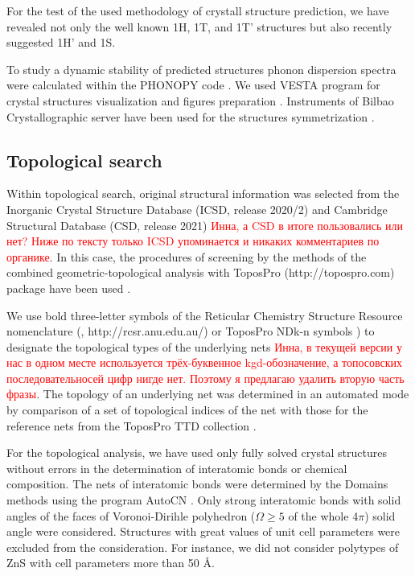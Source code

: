 \documentclass[a4paperm]{article}
\begin{document}
For the test of the used methodology of crystall structure prediction, we have revealed not only the well known 1H, 1T, and 1T' structures but also recently suggested 1H' and 1S.

To study a dynamic stability of predicted structures phonon dispersion spectra were calculated within the PHONOPY code \cite{phonopy}. 
We used VESTA program for crystal structures visualization and figures preparation \cite{momma2011vesta}.
Instruments of Bilbao Crystallographic server have been used for the structures symmetrization \cite{bilbao}.



\subsection*{Topological search}

Within topological search, original structural information was selected from the Inorganic Crystal Structure Database (ICSD, release 2020/2) \cite{icsd_1} and Cambridge Structural Database (CSD, release 2021) \cite{icsd_2} 
\textcolor{red}{Инна, а CSD в итоге пользовались или нет? Ниже по тексту только ICSD упоминается и никаких комментариев по органике}.
In this case, the procedures of screening  by the methods of the combined geometric-topological analysis with ToposPro (http://topospro.com) package have been used \cite{topos_1}. 

We use bold three-letter symbols of the Reticular Chemistry Structure Resource nomenclature (\cite{rcsr}, http://rcsr.anu.edu.au/) or ToposPro NDk-n symbols \cite{rcsr_2}) to designate the topological types of the underlying nets
\textcolor{red}{Инна, в текущей версии у нас в одном месте используется трёх-буквенное kgd-обозначение, а топосовских последовательносей цифр нигде нет. Поэтому я предлагаю удалить вторую часть фразы}.
The topology of an underlying net was determined in an automated mode by comparison of a set of topological indices of the net with those for the reference nets from the ToposPro TTD collection \cite{TTD}.

For the topological analysis, we have used only fully solved crystal structures without errors in the determination of interatomic bonds or chemical composition.
The nets of interatomic bonds were determined by the Domains methods using the program AutoCN \cite{blatov2016_rods}. 
Only strong interatomic bonds with solid angles of the faces of Voronoi-Dirihle polyhedron ($\Omega \geq 5 $ of the whole 4$\pi$) solid angle were considered.
Structures with great values of unit cell parameters were excluded from the consideration.
For instance, we did not consider polytypes of ZnS with cell parameters more than 50 \AA.
\end{document}
